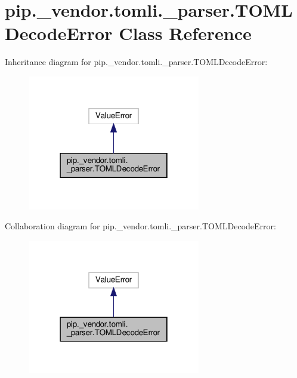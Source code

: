 \hypertarget{classpip_1_1__vendor_1_1tomli_1_1__parser_1_1TOMLDecodeError}{}\section{pip.\+\_\+vendor.\+tomli.\+\_\+parser.\+T\+O\+M\+L\+Decode\+Error Class Reference}
\label{classpip_1_1__vendor_1_1tomli_1_1__parser_1_1TOMLDecodeError}


Inheritance diagram for pip.\+\_\+vendor.\+tomli.\+\_\+parser.\+T\+O\+M\+L\+Decode\+Error\+:
\nopagebreak
\begin{figure}[H]
\begin{center}
\leavevmode
\includegraphics[width=214pt]{classpip_1_1__vendor_1_1tomli_1_1__parser_1_1TOMLDecodeError__inherit__graph}
\end{center}
\end{figure}


Collaboration diagram for pip.\+\_\+vendor.\+tomli.\+\_\+parser.\+T\+O\+M\+L\+Decode\+Error\+:
\nopagebreak
\begin{figure}[H]
\begin{center}
\leavevmode
\includegraphics[width=214pt]{classpip_1_1__vendor_1_1tomli_1_1__parser_1_1TOMLDecodeError__coll__graph}
\end{center}
\end{figure}


